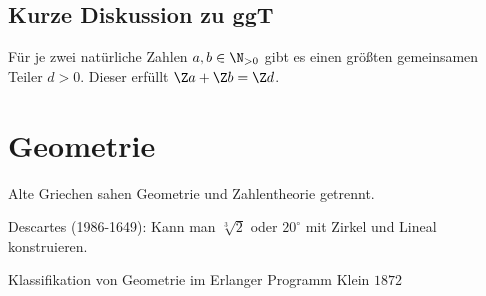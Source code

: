 \subsection{Kurze Diskussion zu ggT}
\begin{proposition}
	Für je zwei natürliche Zahlen $a,b \in \N_{>0}$ gibt es einen größten gemeinsamen Teiler $d > 0$.
	Dieser erfüllt $\Z a + \Z b = \Z d$.
\end{proposition}


\section{Geometrie}
Alte Griechen sahen Geometrie und Zahlentheorie getrennt.

Descartes (1986-1649): Kann man $\sqrt[3]{2}$ oder $20^{\circ}$ mit Zirkel und Lineal konstruieren.

Klassifikation von Geometrie im Erlanger Programm Klein $1872$














